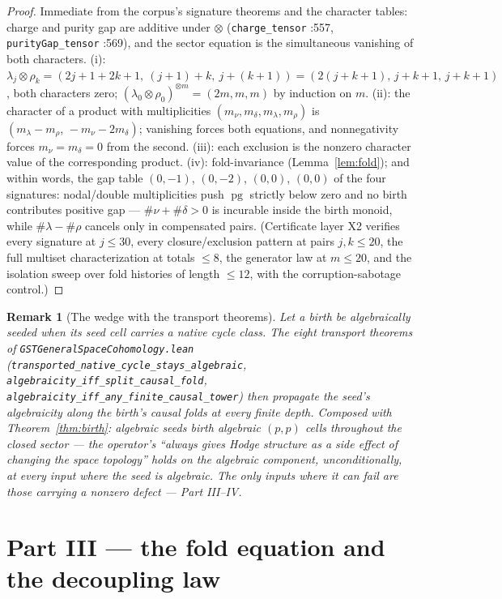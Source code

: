 \documentclass[11pt]{article}
\newtheorem{remark}[theorem]{Remark}
\begin{document}
\begin{proof}
Immediate from the corpus's signature theorems and the character tables: charge and purity gap are additive under $\otimes$ (\texttt{charge\_tensor} :557, \texttt{purityGap\_tensor} :569), and the sector equation is the simultaneous vanishing of both characters. (i): $\lambda_j\otimes\rho_k=(2j+1+2k+1,\ (j+1)+k,\ j+(k+1))=(2(j+k+1),\,j+k+1,\,j+k+1)$, both characters zero; $(\lambda_0\otimes\rho_0)^{\otimes m}=(2m,m,m)$ by induction on $m$. (ii): the character of a product with multiplicities $(m_\nu,m_\delta,m_\lambda,m_\rho)$ is $(m_\lambda-m_\rho,\,-m_\nu-2m_\delta)$; vanishing forces both equations, and nonnegativity forces $m_\nu=m_\delta=0$ from the second. (iii): each exclusion is the nonzero character value of the corresponding product. (iv): fold-invariance (Lemma~\ref{lem:fold}); and within words, the gap table $(0,-1)$, $(0,-2)$, $(0,0)$, $(0,0)$ of the four signatures: nodal/double multiplicities push $\operatorname{pg}$ strictly below zero and no birth contributes positive gap — $\#\nu+\#\delta>0$ is incurable inside the birth monoid, while $\#\lambda-\#\rho$ cancels only in compensated pairs. (Certificate layer X2 verifies every signature at $j\le 30$, every closure/exclusion pattern at pairs $j,k\le 20$, the full multiset characterization at totals $\le 8$, the generator law at $m\le 20$, and the isolation sweep over fold histories of length $\le 12$, with the corruption-sabotage control.)
\end{proof}

\begin{remark}[The wedge with the transport theorems]
Let a birth be \emph{algebraically seeded} when its seed cell carries a native cycle class. The eight transport theorems of \texttt{GSTGeneralSpaceCohomology.lean} (\texttt{transported\_native\_cycle\_stays\_algebraic}, \texttt{algebraicity\_iff\_split\_causal\_fold}, \texttt{algebraicity\_iff\_any\_finite\_causal\_tower}) then propagate the seed's algebraicity along the birth's causal folds at every finite depth. Composed with Theorem~\ref{thm:birth}: \emph{algebraic seeds birth algebraic $(p,p)$ cells throughout the closed sector} — the operator's ``always gives Hodge structure as a side effect of changing the space topology'' holds \emph{on the algebraic component}, unconditionally, at every input where the seed is algebraic. The only inputs where it can fail are those carrying a nonzero defect — Part III--IV.
\end{remark}

\section{Part III — the fold equation and the decoupling law}
\end{document}
